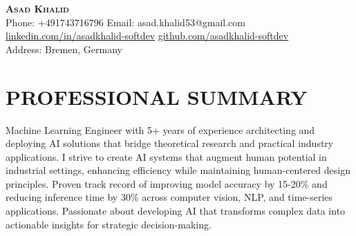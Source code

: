 \documentclass[letterpaper,11pt]{article}
\begin{document}
\begin{center}
    \textbf{\fontsize{24}{28}\selectfont\scshape Asad Khalid} \\ \vspace{12pt}
    \small
    Phone: +491743716796 \quad
    Email: asad.khalid53@gmail.com \\ \vspace{4pt}
    \href{https://www.linkedin.com/in/asadkhalid-softdev/}{linkedin.com/in/asadkhalid-softdev} \quad
    \href{https://github.com/asadkhalid-softdev}{github.com/asadkhalid-softdev} \\ \vspace{4pt}
    Address: Bremen, Germany
\end{center}


\section{PROFESSIONAL SUMMARY}
Machine Learning Engineer with 5+ years of experience architecting and deploying AI solutions that bridge theoretical research and practical industry applications. I strive to create AI systems that augment human potential in industrial settings, enhancing efficiency while maintaining human-centered design principles. Proven track record of improving model accuracy by 15-20\% and reducing inference time by 30\% across computer vision, NLP, and time-series applications. Passionate about developing AI that transforms complex data into actionable insights for strategic decision-making.

\end{document}
